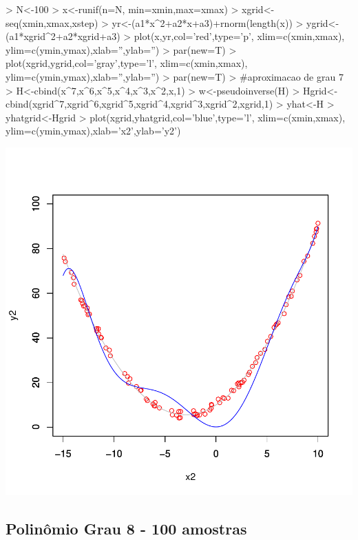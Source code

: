 \documentclass{article}
\begin{document}
\begin{Schunk}
\begin{Sinput}
>   N<-100
>   x<-runif(n=N, min=xmin,max=xmax)
>   xgrid<-seq(xmin,xmax,xstep)
>   yr<-(a1*x^2+a2*x+a3)+rnorm(length(x))
>   ygrid<-(a1*xgrid^2+a2*xgrid+a3)
>   plot(x,yr,col='red',type='p', xlim=c(xmin,xmax), ylim=c(ymin,ymax),xlab='',ylab='')
>   par(new=T)
>   plot(xgrid,ygrid,col='gray',type='l', xlim=c(xmin,xmax), ylim=c(ymin,ymax),xlab='',ylab='')
>   par(new=T)
>   #aproximacao de grau 7
>   H<-cbind(x^7,x^6,x^5,x^4,x^3,x^2,x,1)
>   w<-pseudoinverse(H) %
>   Hgrid<-cbind(xgrid^7,xgrid^6,xgrid^5,xgrid^4,xgrid^3,xgrid^2,xgrid,1)
>   yhat<-H%
>   yhatgrid<-Hgrid%
>   plot(xgrid,yhatgrid,col='blue',type='l', xlim=c(xmin,xmax), ylim=c(ymin,ymax),xlab='x2',ylab='y2')
\end{Sinput}
\end{Schunk}
\includegraphics{aproximacao_polinomial-016}

\newpage
\subsection{Polinômio Grau 8 - 100 amostras}
\end{document}
